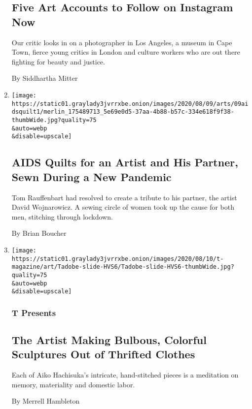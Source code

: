 \begin{enumerate}
  \hypertarget{five-art-accounts-to-follow-on-instagram-now}{%
  \subsection{Five Art Accounts to Follow on Instagram
  Now}\label{five-art-accounts-to-follow-on-instagram-now}}

  Our critic looks in on a photographer in Los Angeles, a museum in Cape
  Town, fierce young critics in London and culture workers who are out
  there fighting for beauty and justice.

  By Siddhartha Mitter
\item
  \href{/2020/08/10/arts/design/aids-quilts-david-wojnarowicz-.html}{}

  \texttt{[image: https://static01.graylady3jvrrxbe.onion/images/2020/08/09/arts/09aidsquilt1/merlin\_175489713\_5e69e0d5-37aa-4b88-b57c-334e618f9f38-thumbWide.jpg?quality=75\\\&auto=webp\\\&disable=upscale]}

  \hypertarget{aids-quilts-for-an-artist-and-his-partner-sewn-during-a-new-pandemic}{%
  \subsection{AIDS Quilts for an Artist and His Partner, Sewn During a
  New
  Pandemic}\label{aids-quilts-for-an-artist-and-his-partner-sewn-during-a-new-pandemic}}

  Tom Rauffenbart had resolved to create a tribute to his partner, the
  artist David Wojnarowicz. A sewing circle of women took up the cause
  for both men, stitching through lockdown.

  By Brian Boucher
\item
  \href{/2020/08/10/t-magazine/aiko-hachisuka-art-sculpture.html}{}

  \texttt{[image: https://static01.graylady3jvrrxbe.onion/images/2020/08/10/t-magazine/art/Tadobe-slide-HVS6/Tadobe-slide-HVS6-thumbWide.jpg?quality=75\\\&auto=webp\\\&disable=upscale]}

  \hypertarget{t-presents}{%
  \subsubsection{T Presents}\label{t-presents}}

  \hypertarget{the-artist-making-bulbous-colorful-sculptures-out-of-thrifted-clothes}{%
  \subsection{The Artist Making Bulbous, Colorful Sculptures Out of
  Thrifted
  Clothes}\label{the-artist-making-bulbous-colorful-sculptures-out-of-thrifted-clothes}}

  Each of Aiko Hachisuka's intricate, hand-stitched pieces is a
  meditation on memory, materiality and domestic labor.

  By Merrell Hambleton
\end{enumerate}

